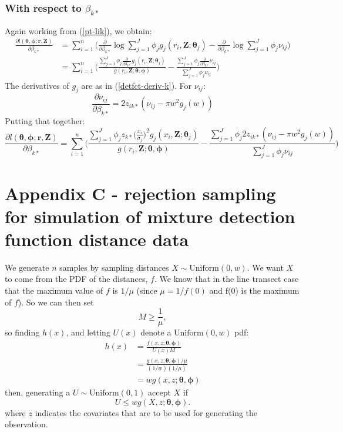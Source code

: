 \documentclass[useAMS,referee, usegraphicx]{biom}
\begin{document}
\subsubsection*{With respect to $\beta_{k*}$}

Again working from (\ref{pt-lik}), we obtain:
\begin{align*}
\frac{\partial l(\bm{\theta}, \bm{\phi}; \mathbf{r},\mathbf{Z})}{\partial \beta_{k*}}  &= \sum_{i=1}^n \Big( \frac{\partial}{\partial \beta_{k*}} \log \sum_{j=1}^J \phi_j g_j(r_i,\mathbf{Z}; \bm{\theta}_j) - \frac{\partial}{\partial \beta_{k*}}\log \sum_{j=1}^J \phi_j \nu_{ij}\Big)\\
&= \sum_{i=1}^n \Big( \frac{ \sum_{j=1}^J \phi_{j} \frac{\partial}{\partial \beta_{k*}}  g_{j} (r_i,\mathbf{Z}; \bm{\theta}_j)}{g(r_i,\mathbf{Z}; \bm{\theta}, \bm{\phi})} - \frac{ \sum_{j=1}^J \phi_{j}\frac{\partial}{\partial \beta_{k*}}  \nu_{ij} }{ \sum_{j=1}^J \phi_j \nu_{ij}}\Big)
\end{align*}
The derivatives of $g_j$ are as in (\ref{detfct-deriv-k}). For $\nu_{ij}$:
\begin{equation*}
\frac{\partial \nu_{ij}}{\partial \beta_{k*}} =  2z_{ik*}(\nu_{ij} - \pi w^2 g_j(w))
\end{equation*}
Putting that together:
\begin{equation*}
\frac{\partial l(\bm{\theta}, \bm{\phi}; \mathbf{r},\mathbf{Z})}{\partial \beta_{k*}}  = \sum_{i=1}^n \Big( \frac{ \sum_{j=1}^J \phi_{j} z_{k*} \Big( \frac{x_i}{\sigma_{j}}\Big)^2 g_j(x_i,\mathbf{Z}; \bm{\theta}_j)}{g(r_i,\mathbf{Z}; \bm{\theta}, \bm{\phi})} - \frac{ \sum_{j=1}^J \phi_{j}2z_{ik*}(\nu_{ij} - \pi w^2 g_j(w)) }{ \sum_{j=1}^J \phi_j \nu_{ij}}\Big)
\end{equation*}



\section*{Appendix C - rejection sampling for simulation of mixture detection function distance data}

We generate $n$ samples by sampling distances $X\sim \text{Uniform}(0,w)$. We want $X$ to come from the PDF of the distances, $f$. We know that in the line transect case that the maximum value of $f$ is $1/\mu$ (since $\mu=1/f(0)$ and f(0) is the maximum of $f$). So we can then set
\begin{equation*}
M \geq \frac{1}{\mu},
\end{equation*}
so finding $h(x)$, and letting $U(x)$ denote a $\text{Uniform}(0,w)$ pdf:
\begin{align*}
h(x) &= \frac{f(x,z; \bm{\theta}, \bm{\phi})}{U(x) M}\\
&= \frac{g(x,z; \bm{\theta}, \bm{\phi})/\mu}{(1/w) (1/\mu)}\\
&= w g(x,z; \bm{\theta}, \bm{\phi})
\end{align*}
then, generating a $U \sim \text{Uniform}(0,1)$ accept $X$ if 
\begin{equation*}
U \leq wg(X,z; \bm{\theta}, \bm{\phi}).
\end{equation*}
where $z$ indicates the covariates that are to be used for generating the observation.
\end{document}
